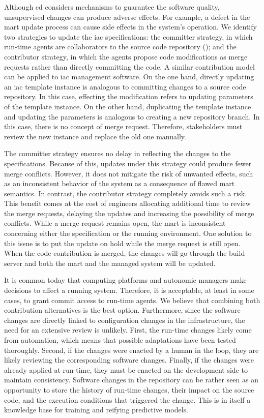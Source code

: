 Although \gls{cd} considers mechanisms to guarantee the software quality, unsupervised changes can produce adverse effects. For example, a defect in the \gls{mart} update process can cause side effects in the system's operation. We identify two strategies to update the \gls{iac} specifications: the committer strategy, in which run-time agents are collaborators to the source code repository (); and the contributor strategy, in which the agents propose code modifications as merge requests rather than directly committing the code. A similar contribution model can be applied to \gls{iac} management software. On the one hand, directly updating an \gls{iac} template instance is analogous to committing changes to a source code repository. In this case, effecting the modification refers to updating parameters of the template instance. On the other hand, duplicating the template instance and updating the parameters is analogous to creating a new repository branch. In this case, there is no concept of merge request. Therefore, stakeholders must review the new instance and replace the old one manually.
	
The committer strategy ensures no delay in reflecting the changes to the specifications. Because of this, updates under this strategy could produce fewer merge conflicts. However, it does not mitigate the risk of unwanted effects, such as an inconsistent behavior of the system as a consequence of flawed \gls{mart} semantics. In contrast, the contributor strategy completely avoids such a risk. This benefit comes at the cost of engineers allocating additional time to review the merge requests, delaying the updates and increasing the possibility of merge conflicts. While a merge request remains open, the \gls{mart} is inconsistent concerning either the specification or the running environment. One solution to this issue is to put the update on hold while the merge request is still open. When the code contribution is merged, the changes will go through the build server and both the \gls{mart} and the managed system will be updated.

It is common today that computing platforms and autonomic managers make decisions to affect a running system. Therefore, it is acceptable, at least in some cases, to grant commit access to run-time agents. We believe that combining both contribution alternatives is the best option. Furthermore, since the software changes are directly linked to configuration changes in the infrastructure, the need for an extensive review is unlikely. First, the run-time changes likely come from automation, which means that possible adaptations have been tested thoroughly. Second, if the changes were enacted by a human in the loop, they are likely reviewing the corresponding software changes. Finally, if the changes were already applied at run-time, they must be enacted on the development side to maintain consistency. Software changes in the repository can be rather seen as an opportunity to store the history of run-time changes, their impact on the source code, and the execution conditions that triggered the change. This is in itself a knowledge base for training and reifying predictive models.


